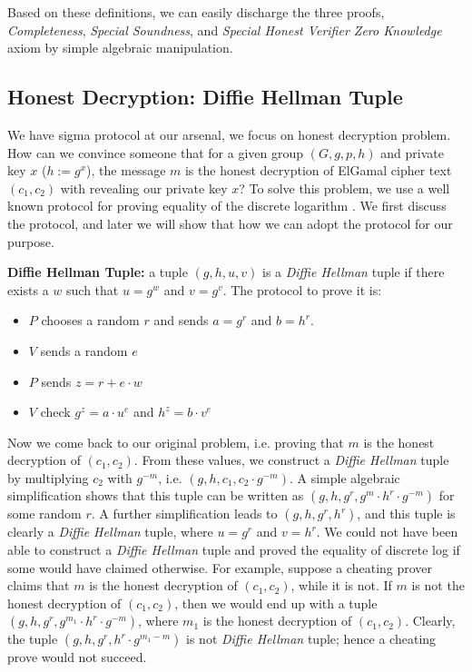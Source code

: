 Based on these definitions, we can easily discharge the three proofs, \textit{Completeness}, 
\textit{Special Soundness}, and \textit{Special Honest Verifier Zero Knowledge} axiom by simple 
algebraic manipulation.

\subsection{Honest Decryption: Diffie Hellman Tuple}
\label{sec:dec_sigma}
We have sigma protocol at our arsenal, we focus on honest decryption 
problem. How can we convince someone that for a given group 
$(G, g, p, h)$ and private key $x$ ($h := g^x$), the message $m$ is the 
honest decryption of ElGamal cipher text $(c_{1}, c_{2})$ with revealing 
our private key $x$? To solve this problem, we use a well known protocol
for proving equality of the discrete logarithm \citep{10.1007/3-540-69053-0_9}.
We first discuss the protocol, and later we will show that how we can adopt 
the protocol for our purpose. 

\textbf{Diffie Hellman Tuple:} a tuple $(g, h, u, v)$ is 
 a \textit{Diffie Hellman} tuple if there exists a $w$ such that 
 $u = g^w$ and $v = g^v$.  The protocol to prove it is:
 
 \begin{itemize}
 \item $P$ chooses a random $r$ and sends $a=g^r$ and $b = h^r$.
 \item $V$ sends a random $e$
 \item $P$ sends $z =r+ e \cdot w$
 \item $V$ check $g^z = a \cdot u^e$ and $h^z = b\cdot v^e$ 
 \end{itemize}
 

Now we come back to our original problem, i.e. proving that $m$ is the honest 
decryption of $(c_{1}, c_{2})$. From these values, we construct a \textit{Diffie Hellman} tuple
by multiplying $c_{2}$ with $g^{-m}$, i.e.
$(g, h, c_{1}, c_{2} \cdot g^{-m})$. A simple algebraic simplification shows that 
this tuple can be written as $(g, h, g^r, g^m \cdot h^r \cdot g^{-m})$ for some 
random $r$. A further simplification leads to $(g, h, g^r, h^r)$, and 
this tuple is clearly a \textit{Diffie Hellman} tuple, where $u = g^r$ and $v = h^r$. 
We could not have been able to construct a  \textit{Diffie Hellman} tuple and proved 
the equality of discrete log if some would have claimed otherwise. For example, 
suppose a cheating prover  claims that $m$ is the honest decryption of $(c_{1}, c_{2})$,
while it is not. 
If $m$ is not the honest decryption of $(c_{1}, c_{2})$, then we would end up with 
a tuple $(g, h, g^r, g^{m_{1}} \cdot h^r \cdot g^{-m})$, where $m_{1}$ is the honest 
decryption of $(c_{1}, c_{2})$.  Clearly, the tuple $(g, h, g^r, h^r \cdot g^{m_{1} - m})$ is not 
\textit{Diffie Hellman} tuple; hence a cheating prove would not succeed. 




